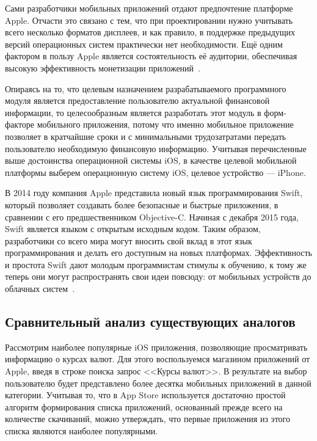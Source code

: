 Сами разработчики мобильных приложений отдают предпочтение платформе Apple.
Отчасти это связано с тем, что при проектировании нужно учитывать всего
несколько форматов дисплеев, и как правило, в поддержке предыдущих
версий операционных систем практически нет необходимости.
Ещё одним фактором в пользу Apple является состоятельность её аудитории,
обеспечивая высокую эффективность монетизации приложений~\cite{ios_android_compare}.



Опираясь на то, что целевым назначением разрабатываемого программного модуля
является предоставление пользователю актуальной финансовой информации,
то целесообразным является разработать этот модуль в форм-факторе мобильного
приложения, потому что именно мобильное приложение позволяет в кратчайшие сроки
и с минимальными трудозатратами передать пользователю необходимую финансовую
информацию.
Учитывая перечисленные выше достоинства операционной системы iOS, в качестве
целевой мобильной платформы выберем операционную систему iOS,
целевое устройство --- iPhone.

В 2014 году компания Apple представила новый язык программирования Swift,
который позволяет создавать более безопасные и быстрые приложения, в сравнении
с его предшественником Objective-C.
Начиная с декабря 2015 года, Swift является языком с открытым исходным кодом.
Таким образом, разработчики со всего мира могут вносить свой вклад
в этот язык программирования и делать его доступным на новых платформах.
Эффективность и простота Swift дают молодым программистам стимулы к обучению,
к тому же теперь они могут распространять свои идеи повсюду:
от мобильных устройств до облачных систем~\cite{swift_becomes_open_source}.



\subsection{Сравнительный анализ существующих аналогов}
\label{subs:compare_equivalents}

Рассмотрим наиболее популярные iOS приложения, позволяющие просматривать
информацию о курсах валют. Для этого воспользуемся магазином приложений от Apple,
введя в строке поиска запрос <<Курсы валют>>. В результате на выбор
пользователю будет представлено более десятка мобильных приложений в данной
категории. Учитывая то, что в App Store используется достаточно
простой алгоритм формирования списка приложений, основанный прежде всего на
количестве скачиваний, можно утверждать, что первые приложения из этого списка
являются наиболее популярными.

